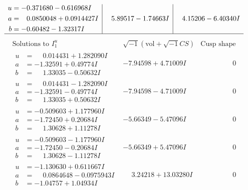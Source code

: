 \documentclass[1p]{elsarticle_modified}
\theoremstyle{definition}
\newcommand{\I}{\sqrt{-1}}
\begin{document}
$$\begin{array}{c|c|c}
\begin{aligned}
u &= -0.371680 - 0.616968 I \\
a &= \phantom{-}0.0850048 + 0.0914427 I \\
b &= -0.60482 - 1.32317 I\end{aligned}
 & \phantom{-}5.89517 - 1.74663 I & \phantom{-}4.15206 - 6.40340 I\\
 \hline 
 \end{array}$$\newpage$$\begin{array}{c|c|c}  
\text{Solutions to }I^u_{1}& \I (\text{vol} + \sqrt{-1}CS) & \text{Cusp shape}\\
 \hline 
\begin{aligned}
u &= \phantom{-}0.014431 + 1.282090 I \\
a &= -1.32591 + 0.49774 I \\
b &= \phantom{-}1.33035 - 0.50632 I\end{aligned}
 & -7.94598 + 4.71009 I & \phantom{-0.000000 } 0 \\ \hline\begin{aligned}
u &= \phantom{-}0.014431 - 1.282090 I \\
a &= -1.32591 - 0.49774 I \\
b &= \phantom{-}1.33035 + 0.50632 I\end{aligned}
 & -7.94598 - 4.71009 I & \phantom{-0.000000 } 0 \\ \hline\begin{aligned}
u &= -0.509603 + 1.177960 I \\
a &= -1.72450 + 0.20684 I \\
b &= \phantom{-}1.30628 + 1.11278 I\end{aligned}
 & -5.66349 - 5.47096 I & \phantom{-0.000000 } 0 \\ \hline\begin{aligned}
u &= -0.509603 - 1.177960 I \\
a &= -1.72450 - 0.20684 I \\
b &= \phantom{-}1.30628 - 1.11278 I\end{aligned}
 & -5.66349 + 5.47096 I & \phantom{-0.000000 } 0 \\ \hline\begin{aligned}
u &= -1.130630 + 0.611667 I \\
a &= \phantom{-}0.0864648 - 0.0975943 I \\
b &= -1.04757 + 1.04934 I\end{aligned}
 & \phantom{-}3.24218 + 13.03280 I & \phantom{-0.000000 } 0 \\ \hline\begin{aligned}

\end{aligned}
\end{array}$$
\end{document}

